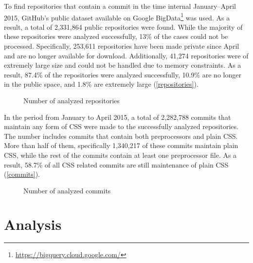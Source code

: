 To find repositories that contain a commit in the time internal January--April
2015, GitHub's public dataset available on Google
BigData\footnote{\url{https://bigquery.cloud.google.com/}} was used. As a result, a
total of 2,331,864 public repositories were found. While the majority of these
repositories were analyzed successfully, 13\% of the cases could not be
processed. Specifically, 253,611 repositories have been made private since
April and are no longer available for download. Additionally, 41,274
repositories were of extremely large size and could not be handled due to
memory constraints. As a result, 87.4\% of the repositories were analyzed
successfully, 10.9\% are no longer in the public space, and 1.8\% are
extremely large (\autoref{repositories}).

\begin{figure}
  \centering
  \caption{
    \label{repositories}
    Number of analyzed repositories}
\end{figure}


In the period from January to April 2015, a total of 2,282,788 commits that maintain
any form of CSS were made to the successfully analyzed repositories. The
number includes commits that contain both preprocessors and plain CSS. More
than half of them, specifically 1,340,217 of these commits maintain plain CSS,
while the rest of the commits contain at least one preprocessor file. As a
result, 58.7\% of all CSS related commits are still maintenance of plain CSS
(\autoref{commits}).

\begin{figure}
  \centering
  \caption{
    \label{commits}
  	Number of analyzed commits}
\end{figure}

\section{Analysis}

